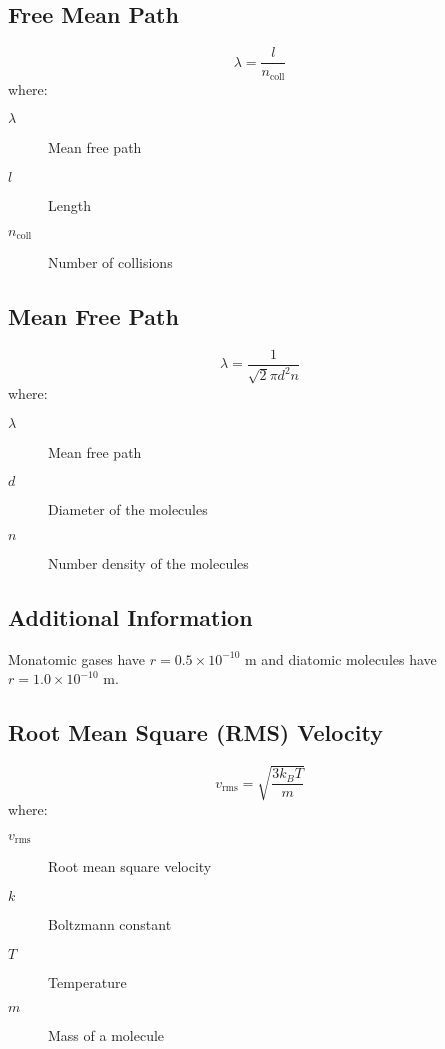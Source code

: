 \documentclass{article}
\begin{document}
\subsection{Free Mean Path}
\begin{equation}
\lambda = \frac{l}{n_{\text{coll}}}
\end{equation}
where:
\begin{description}
    \item[$\lambda$] Mean free path
    \item[$l$] Length
    \item[$n_{\text{coll}}$] Number of collisions
\end{description}


\subsection*{Mean Free Path}
\begin{equation}
\lambda = \frac{1}{\sqrt{2} \pi d^2 n}
\end{equation}
where:
\begin{description}
    \item[$\lambda$] Mean free path
    \item[$d$] Diameter of the molecules
    \item[$n$] Number density of the molecules
\end{description}


\subsection*{Additional Information}
Monatomic gases have \( r = 0.5 \times 10^{-10} \) m and diatomic molecules have \( r = 1.0 \times 10^{-10} \) m.

\subsection*{Root Mean Square (RMS) Velocity}
\begin{equation}
    v_{\text{rms}} = \sqrt{\frac{3k_B T}{m}}
    \end{equation}
where:
\begin{description}
    \item[$v_{\text{rms}}$] Root mean square velocity
    \item[$k$] Boltzmann constant
    \item[$T$] Temperature
    \item[$m$] Mass of a molecule
\end{description}
\end{document}
